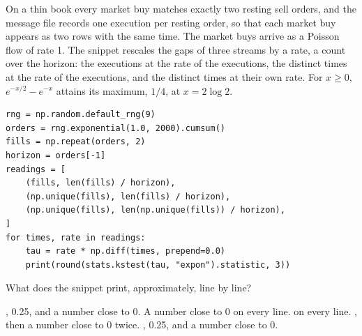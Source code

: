\begin{question}
\label{question.fillsSharingATimestamp}
On a thin book every market buy matches exactly two resting sell orders,
and the message file records one execution per resting order,
so that each market buy appears as two rows with the same time.
The market buys arrive as a Poisson flow of rate 1.
The snippet rescales the gaps of three streams by a rate,
a count over the horizon:
the executions at the rate of the executions,
the distinct times at the rate of the executions,
and the distinct times at their own rate.
For $x \geq 0$, $e^{-x/2} - e^{-x}$ attains its maximum, $1/4$, at $x = 2\log 2$.
\begin{lstlisting}[caption={The statistic $D$ on three streams}, label=listing.fillsSharingATimestamp]
rng = np.random.default_rng(9)
orders = rng.exponential(1.0, 2000).cumsum()
fills = np.repeat(orders, 2)
horizon = orders[-1]
readings = [
    (fills, len(fills) / horizon),
    (np.unique(fills), len(fills) / horizon),
    (np.unique(fills), len(np.unique(fills)) / horizon),
]
for times, rate in readings:
    tau = rate * np.diff(times, prepend=0.0)
    print(round(stats.kstest(tau, "expon").statistic, 3))
\end{lstlisting}
What does the snippet print, approximately, line by line?
\begin{choices}
 , 0.25, and a number close to 0.
 \choice A number close to 0 on every line.
  on every line.
 , then a number close to 0 twice.
 , 0.25, and a number close to 0.
\end{choices}
\end{question}

